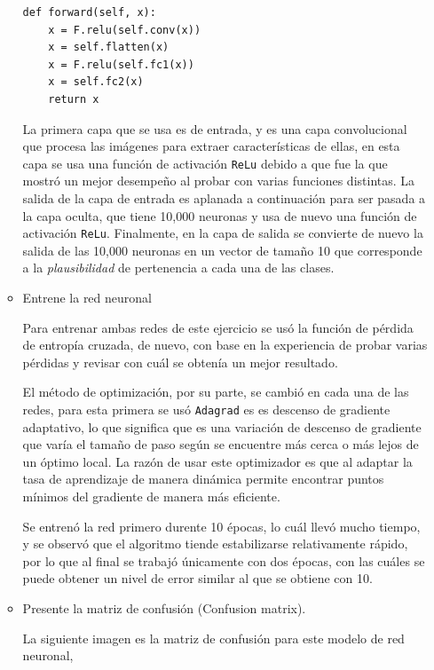 \documentclass{article}
\begin{document}
\begin{enumerate}
\begin{itemize}
\begin{lstlisting}
def forward(self, x):
    x = F.relu(self.conv(x))
    x = self.flatten(x)
    x = F.relu(self.fc1(x))
    x = self.fc2(x)
    return x\end{lstlisting}

    La primera capa que se usa es de entrada, y es una capa convolucional que procesa
    las imágenes para extraer características de ellas, en esta capa se usa una función
    de activación \texttt{ReLu} debido a que fue la que mostró un mejor desempeño al 
    probar con varias funciones distintas. La salida de la capa de entrada es aplanada 
    a continuación para ser pasada a la capa oculta, que tiene 10,000 neuronas y usa
    de nuevo una función de activación \texttt{ReLu}. Finalmente, en la capa de salida
    se convierte de nuevo la salida de las 10,000 neuronas en un vector de tamaño 10
    que corresponde a la \textit{plausibilidad} de pertenencia a cada una de las clases.

        \item Entrene la red neuronal
        
        Para entrenar ambas redes de este ejercicio se usó la función de pérdida de
        entropía cruzada, de nuevo, con base en la experiencia de probar varias pérdidas
        y revisar con cuál se obtenía un mejor resultado. 

        El método de optimización, por su parte, se cambió en cada una de las redes, 
        para esta primera se usó \texttt{Adagrad} es es descenso de gradiente adaptativo,
        lo que significa que es una variación de descenso de gradiente que varía el
        tamaño de paso según se encuentre más cerca o más lejos de un óptimo local. La 
        razón de usar este optimizador es que al adaptar la tasa de aprendizaje de manera
        dinámica permite encontrar puntos mínimos del gradiente de manera más eficiente.

        Se entrenó la red primero durente 10 épocas, lo cuál llevó mucho tiempo, y se observó
        que el algoritmo tiende estabilizarse relativamente rápido, por lo que al final
        se trabajó únicamente con dos épocas, con las cuáles se puede obtener un nivel de 
        error similar al que se obtiene con 10.

        \item Presente la matriz de confusión (Confusion matrix).
        
        La siguiente imagen es la matriz de confusión para este modelo de red neuronal,


\end{itemize}
\end{enumerate}
\end{document}
